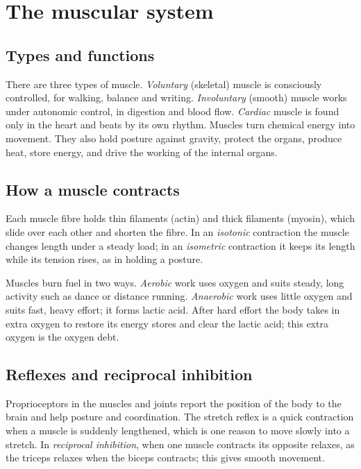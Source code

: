 
\section{The muscular system}

\subsection*{Types and functions}
There are three types of muscle. \emph{Voluntary} (skeletal) muscle is consciously controlled, for walking, balance and writing. \emph{Involuntary} (smooth) muscle works under autonomic control, in digestion and blood flow. \emph{Cardiac} muscle is found only in the heart and beats by its own rhythm. Muscles turn chemical energy into movement. They also hold posture against gravity, protect the organs, produce heat, store energy, and drive the working of the internal organs.


\subsection*{How a muscle contracts}
Each muscle fibre holds thin filaments (actin) and thick filaments (myosin), which slide over each other and shorten the fibre. In an \emph{isotonic} contraction the muscle changes length under a steady load; in an \emph{isometric} contraction it keeps its length while its tension rises, as in holding a posture.

Muscles burn fuel in two ways. \emph{Aerobic} work uses oxygen and suits steady, long activity such as dance or distance running. \emph{Anaerobic} work uses little oxygen and suits fast, heavy effort; it forms lactic acid. After hard effort the body takes in extra oxygen to restore its energy stores and clear the lactic acid; this extra oxygen is the oxygen debt.


\subsection*{Reflexes and reciprocal inhibition}
Proprioceptors in the muscles and joints report the position of the body to the brain and help posture and coordination. The stretch reflex is a quick contraction when a muscle is suddenly lengthened, which is one reason to move slowly into a stretch. In \emph{reciprocal inhibition}, when one muscle contracts its opposite relaxes, as the triceps relaxes when the biceps contracts; this gives smooth movement.

